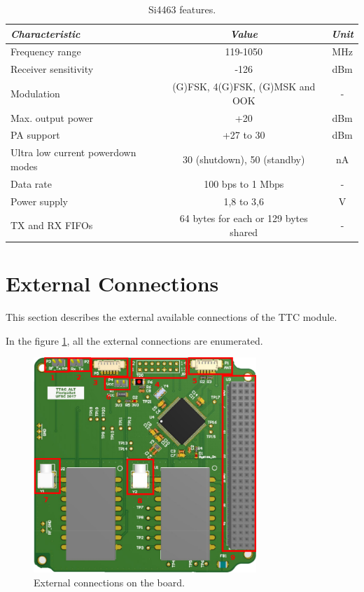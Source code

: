 \documentclass[12pt]{book}
\begin{document}
\begin{table}[!h]
	\begin{center}
		\begin{tabular}{lcc}
			\toprule[1.5pt]
			\textit{Characteristic} & \textit{Value} & \textit{Unit} \\
			\midrule
			Frequency range & 119-1050 & MHz \\
			Receiver sensitivity & -126 & dBm \\
			Modulation & (G)FSK, 4(G)FSK, (G)MSK and OOK & - \\
			Max. output power & +20 & dBm \\
			PA support & +27 to 30 & dBm \\
			Ultra low current powerdown modes & 30 (shutdown), 50 (standby) & nA \\
			Data rate & 100 bps to 1 Mbps & - \\
			Power supply & 1,8 to 3,6 & V \\
			TX and RX FIFOs & 64 bytes for each or 129 bytes shared & - \\
			\bottomrule[1.5pt]
		\end{tabular}
		\caption{Si4463 features.}
		\label{tab:si4463-info}
	\end{center}
\end{table}

\section{External Connections}

This section describes the external available connections of the TTC module.

In the figure \ref{fig:connections-ref}, all the external connections are enumerated.

\begin{figure}[!h]
	\begin{center}
		\includegraphics[width=0.75\textwidth]{figures/ttc_board_pins}
		\caption{External connections on the board.}
		\label{fig:connections-ref}
	\end{center}
\end{figure}
\end{document}
